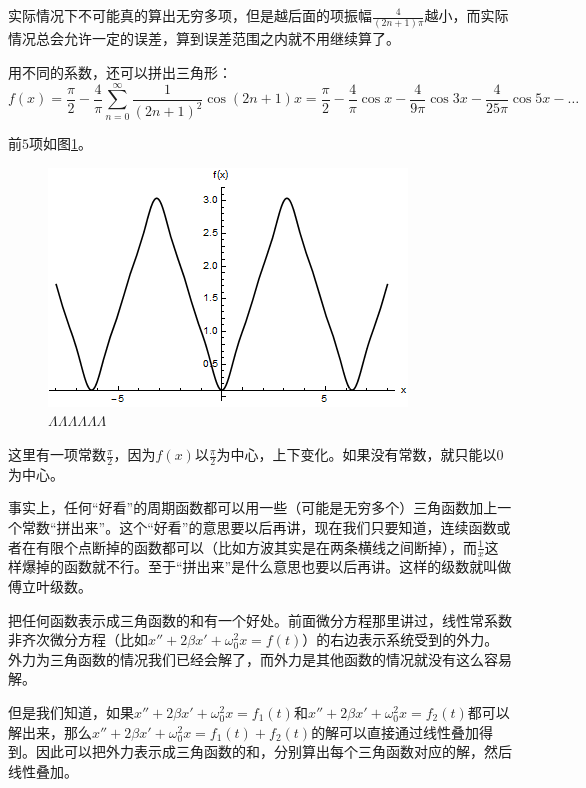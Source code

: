 实际情况下不可能真的算出无穷多项，但是越后面的项振幅$\frac{4}{(2 n+1) \pi}$越小，而实际情况总会允许一定的误差，算到误差范围之内就不用继续算了。

用不同的系数，还可以拼出三角形：
\begin{equation*}
f(x)=\frac{\pi}{2}-\frac{4}{\pi} \sum_{n=0}^{\infty} \frac{1}{(2 n+1)^2} \cos (2 n+1) x=\frac{\pi}{2}-\frac{4}{\pi} \cos x-\frac{4}{9 \pi} \cos 3 x-\frac{4}{25 \pi} \cos 5 x-\dots
\end{equation*}

前$5$项如图\ref{fig-trigo-triangle-wave}。
\begin{figure}[htb]
\centering
\includegraphics[scale=0.5]{fig/trigo-triangle-wave.png}
\caption{$\Lambda\Lambda\Lambda\Lambda\Lambda\Lambda$}
\label{fig-trigo-triangle-wave}
\end{figure}

这里有一项常数$\frac{\pi}{2}$，因为$f(x)$以$\frac{\pi}{2}$为中心，上下变化。如果没有常数，就只能以$0$为中心。

事实上，任何“好看”的周期函数都可以用一些（可能是无穷多个）三角函数加上一个常数“拼出来”。这个“好看”的意思要以后再讲，现在我们只要知道，连续函数或者在有限个点断掉的函数都可以（比如方波其实是在两条横线之间断掉），而$\frac{1}{x}$这样爆掉的函数就不行。至于“拼出来”是什么意思也要以后再讲。这样的级数就叫做傅立叶级数。

把任何函数表示成三角函数的和有一个好处。前面微分方程那里讲过，线性常系数非齐次微分方程（比如$x''+2 \beta x'+\omega_0^2 x=f(t)$）的右边表示系统受到的外力。外力为三角函数的情况我们已经会解了，而外力是其他函数的情况就没有这么容易解。

但是我们知道，如果$x''+2 \beta x'+\omega_0^2 x=f_1(t)$和$x''+2 \beta x'+\omega_0^2 x=f_2(t)$都可以解出来，那么$x''+2 \beta x'+\omega_0^2 x=f_1(t)+f_2(t)$的解可以直接通过线性叠加得到。因此可以把外力表示成三角函数的和，分别算出每个三角函数对应的解，然后线性叠加。


